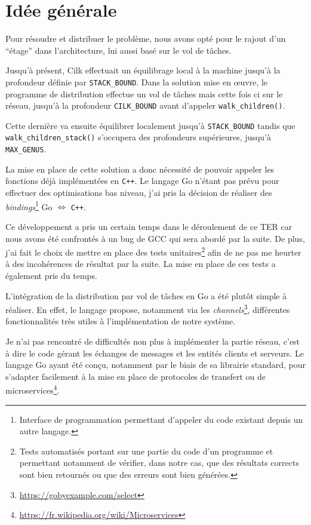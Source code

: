 \documentclass[12pt,a4paper]{report}
\begin{document}
\section{Idée générale}
Pour résoudre et distribuer le problème, nous avons opté pour le rajout d'un ``étage'' dans l'architecture, lui aussi basé sur le vol de tâches.

Jusqu'à présent, Cilk effectuait un équilibrage local à la machine jusqu'à la profondeur définie par \texttt{STACK\_BOUND}. Dans la solution mise en \oe{}uvre, le programme de distribution effectue un vol de tâches mais cette fois ci sur le réseau, jusqu'à la profondeur \texttt{CILK\_BOUND} avant d'appeler \texttt{walk\_children()}.

Cette dernière va ensuite équilibrer localement jusqu'à \texttt{STACK\_BOUND} tandis que \texttt{walk\_children\_stack()} s'occupera des profondeurs supérieures, jusqu'à \texttt{MAX\_GENUS}.

La mise en place de cette solution a donc nécessité de pouvoir appeler les fonctions déjà implémentées en \texttt{C++}. Le langage Go n'étant pas prévu pour effectuer des optimisations bas niveau, j'ai pris la décision de réaliser des \emph{bindings}\footnote{Interface de programmation permettant d'appeler du code existant depuis un autre langage.} Go $\Leftrightarrow$ \texttt{C++}.

Ce développement a pris un certain temps dans le déroulement de ce TER car nous avons été confrontés à un bug de GCC qui sera abordé par la suite. De plus, j'ai fait le choix de mettre en place des tests unitaires\footnote{Tests automatisés portant sur une partie du code d'un programme et permettant notamment de vérifier, dans notre cas, que des résultats corrects sont bien retournés ou que des erreurs sont bien générées.} afin de ne pas me heurter à des incohérences de résultat par la suite. La mise en place de ces tests a également pris du temps.

L'intégration de la distribution par vol de tâches en Go a été plutôt simple à réaliser. En effet, le langage propose, notamment via les \emph{channels}\footnote{\url{https://gobyexample.com/select}}, différentes fonctionnalités très utiles à l'implémentation de notre système.

Je n'ai pas rencontré de difficultés non plus à implémenter la partie réseau, c'est à dire le code gérant les échanges de messages et les entités clients et serveurs. Le langage Go ayant été conçu, notamment par le biais de sa librairie standard, pour s'adapter facilement à la mise en place de protocoles de transfert ou de microservices\footnote{\url{https://fr.wikipedia.org/wiki/Microservices}}.
\end{document}
